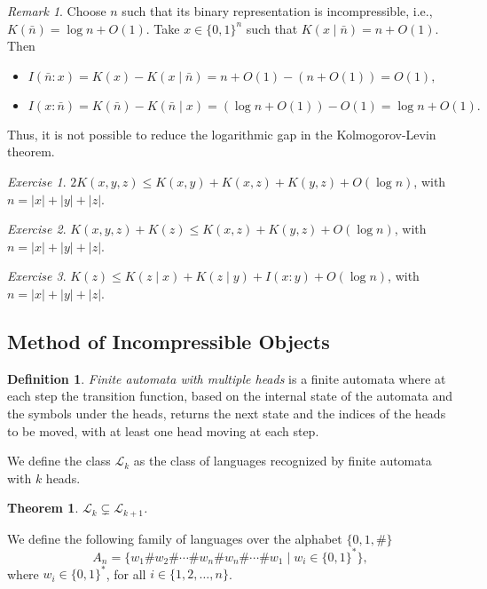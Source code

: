 \documentclass[12pt,sans]{article}
\newcommand{\bits}{\{0,1\}}
\newcommand{\bitstr}{\bits^*}
\theoremstyle{definition}
\newtheorem{definition}{Definition}[section]
\theoremstyle{plain}
\newtheorem{theorem}{Theorem}[section]
\theoremstyle{remark}
\newtheorem{exercise}{Exercise}[section]
\newtheorem{remark}{Remark}[section]
\begin{document}
\begin{remark}
    Choose $n$ such that its binary representation is incompressible, i.e., $K(\bar n) = \log n + O(1)$. Take $x \in \{0,1\}^n$ such that $K(x \mid \bar n) = n + O(1)$. Then
    \begin{itemize}
        \item\(
        I(\bar n : x) = K(x) - K(x \mid \bar n) = n + O(1) - (n + O(1)) = O(1),
        \)
        \item\(
        I(x : \bar n) = K(\bar n) - K(\bar n \mid x) = (\log n + O(1)) - O(1) = \log n + O(1).
        \)
    \end{itemize}
    Thus, it is not possible to reduce the logarithmic gap in the Kolmogorov-Levin theorem.
\end{remark}

\begin{exercise}
    $2K(x,y,z) \le K(x,y) + K(x,z) + K(y,z) + O(\log n)$, with $n = |x| + |y| + |z|$.
\end{exercise}

\begin{exercise}
    $K(x,y,z) + K(z) \le K(x,z) + K(y,z) + O(\log n)$, with $n = |x| + |y| + |z|$.
\end{exercise}

\begin{exercise}
    $K(z) \le K(z \mid x) + K(z \mid y) + I(x:y) + O(\log n)$, with $n = |x| + |y| + |z|$.
\end{exercise}


\subsection{Method of Incompressible Objects}
\begin{definition}
    \emph{Finite automata with multiple heads} is a finite automata where at each step the transition function, based on the internal state of the automata and the symbols under the heads, returns the next state and the indices of the heads to be moved, with at least one head moving at each step.
\end{definition}

We define the class $\mathcal{L}_k$ as the class of languages recognized by finite automata with $k$ heads.

\begin{theorem}\label{thm:kDFA}
    $\mathcal{L}_k \subsetneq \mathcal{L}_{k+1}$.
\end{theorem}

We define the following family of languages over the alphabet $\{0,1,\#\}$
\[
A_n = \{w_1\#w_2\#\dotsb\#w_n\#w_n\#\dotsb\#w_1 \mid w_i \in \bitstr\},
\]
where $w_i \in \bitstr$, for all $i \in \{1,2,\dotsc,n\}$.
\end{document}
